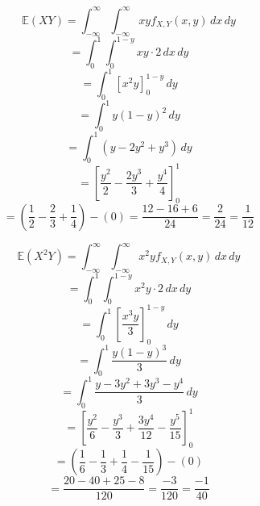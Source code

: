 \documentclass{article}
\begin{document}
   
    \[\mathbb{E}(XY) = \int_{-\infty}^{\infty} \int_{-\infty}^{\infty} xy f_{X,Y}(x,y) \, dx \, dy\]
    \[= \int_{0}^{1} \int_{0}^{1-y} xy \cdot 2 \, dx \, dy\]
    \[= \int_{0}^{1} \left[x^2y\right]_{0}^{1-y} \, dy\]
    \[= \int_{0}^{1} y(1-y)^2 \, dy\] 
    \[= \int_{0}^{1} (y-2y^2+y^3) \, dy\]
    \[= \left[\frac{y^2}{2}-\frac{2y^3}{3}+\frac{y^4}{4}\right]_{0}^{1}\]
    \[= \left(\frac{1}{2}-\frac{2}{3}+\frac{1}{4}\right) - (0) = \frac{12-16+6}{24} = \frac{2}{24} = \boxed{\frac{1}{12}}\]

    \[\mathbb{E}(X^2Y) = \int_{-\infty}^{\infty} \int_{-\infty}^{\infty} x^2y f_{X,Y}(x,y) \, dx \, dy\]
    \[= \int_{0}^{1} \int_{0}^{1-y} x^2y \cdot 2 \, dx \, dy\]
    \[= \int_{0}^{1} \left[\frac{x^3y}{3}\right]_{0}^{1-y} \, dy\]
    \[= \int_{0}^{1} \frac{y(1-y)^3}{3} \, dy\]
    \[= \int_{0}^{1} \frac{y-3y^2+3y^3-y^4}{3} \, dy\]
    \[= \left[\frac{y^2}{6}-\frac{y^3}{3}+\frac{3y^4}{12}-\frac{y^5}{15}\right]_{0}^{1}\]
    \[= \left(\frac{1}{6}-\frac{1}{3}+\frac{1}{4}-\frac{1}{15}\right) - (0)\]
    \[= \frac{20-40+25-8}{120} = \boxed{\frac{-3}{120}} = \boxed{\frac{-1}{40}}\]

    \pagebreak















        
\end{document}
